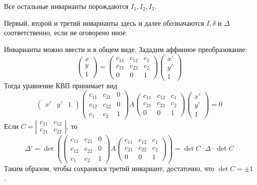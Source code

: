 \begin{Prop}
	Все остальные инварианты порождаются $I_1, I_2, I_3$. 
\end{Prop}

\begin{Rem}
	Первый, второй и третий инварианты здесь и далее обозначаются $I, \delta$ и $\Delta$ соответственно, если не оговорено иное.
\end{Rem}

\begin{Rem}
	Инварианты можно ввести и в общем виде.
	Зададим аффинное преобразование:
	\[\left(\begin{array}{c}
	x \\ 
	y \\ 
	1
	\end{array}\right) = \left(\begin{array}{ccc}
	c_{11} & c_{12} & c_1 \\ 
	c_{21} & c_{22} & c_2 \\ 
	0 & 0 & 1
	\end{array}\right) \left(\begin{array}{c}
	x' \\ 
	y' \\ 
	1
	\end{array}\right)\]
	Тогда уравнение КВП принимает вид
	\[\left(\begin{array}{ccc}
	x' & y' & 1
	\end{array}\right) \left(\begin{array}{ccc}
	c_{11} & c_{21} & 0 \\ 
	c_{12} & c_{22} & 0 \\ 
	c_1 & c_2 & 1
	\end{array}\right) A \left(\begin{array}{ccc}
	c_{11} & c_{12} & c_1 \\ 
	c_{21} & c_{22} & c_2 \\ 
	0 & 0 & 1
	\end{array}\right) \left(\begin{array}{c}
	x' \\ 
	y' \\ 
	1
	\end{array}\right) = 0\]
	Если $C = \left|\begin{array}{cc}
	c_{11} & c_{12} \\ 
	c_{21} & c_{22}
	\end{array}\right|$, то
	\[\Delta' = \det \left(\left(\begin{array}{ccc}
	c_{11} & c_{21} & 0 \\ 
	c_{12} & c_{22} & 0 \\ 
	c_1 & c_2 & 1
	\end{array}\right) A \left(\begin{array}{ccc}
	c_{11} & c_{12} & c_1 \\ 
	c_{21} & c_{22} & c_2 \\ 
	0 & 0 & 1
	\end{array}\right)\right) = \det C \cdot \Delta \cdot \det C\]
	Таким образом, чтобы сохранялся третий инвариант, достаточно, что $\det C = \pm 1$.
	

\end{Rem}
